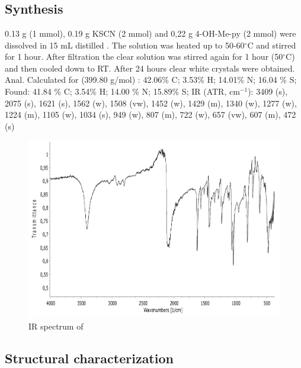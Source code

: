 \section{}
\subsection{Synthesis}
0.13 g  (1 mmol), 0.19 g KSCN (2 mmol) and 0,22 g 4-OH-Me-py (2 mmol) were dissolved in 15 mL distilled . The solution was heated up to 50-60$^\circ$C  and stirred for 1 hour. After filtration the clear solution was stirred again for 1 hour (50$^\circ$C) and then cooled down to RT. After 24 hours clear white crystals were obtained. Anal. Calculated for  (399.80 g/mol) : 42.06\% C; 3.53\% H; 14.01\% N; 16.04 \% S; Found: 41.84 \% C; 3.54\% H; 14.00 \% N; 15.89\% S; IR (ATR, cm$^{-1}$): 3409 (s), 2075 (s), 1621 (s), 1562 (w), 1508 (vw), 1452 (w), 1429 (m), 1340 (w), 1277 (w), 1224 (m), 1105 (w), 1034 (s), 949 (w), 807 (m), 722 (w), 657 (vw), 607 (m), 472 (s)

\begin{figure}[h!]
\centering
\includegraphics[scale=0.5, width=1\textwidth]{figures/ZnR4HOMP-IR.pdf}
\caption{IR spectrum of }
\end{figure}

\newpage
\subsection{Structural characterization}

